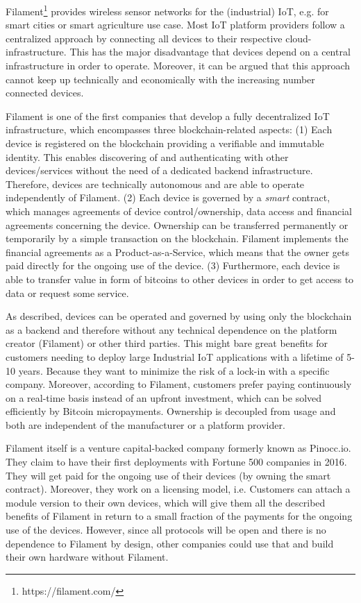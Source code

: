 Filament\footnote{https://filament.com/} provides wireless sensor networks for the (industrial) IoT, e.g. 
for smart cities or smart agriculture use case. Most IoT platform providers follow 
a centralized approach by connecting all devices to their respective cloud-infrastructure. 
This has the major disadvantage that devices depend on a central infrastructure 
in order to operate. Moreover, it can be argued that this approach cannot keep 
up technically and economically with the increasing number connected devices.

Filament is one of the first companies that develop a fully decentralized IoT infrastructure, 
which encompasses three blockchain-related aspects: (1) Each device is registered 
on the blockchain providing a verifiable and immutable identity. This enables discovering 
of and authenticating with other devices/services without the need of a dedicated 
backend infrastructure. Therefore, devices are technically autonomous and are able 
to operate independently of Filament. (2) Each device is governed by a \emph{smart} 
contract, which manages agreements of device control/ownership, data access and 
financial agreements concerning the device. Ownership can be transferred permanently 
or temporarily by a simple transaction on the blockchain. Filament implements the 
financial agreements as a Product-as-a-Service, which means that the owner gets 
paid directly for the ongoing use of the device. (3) Furthermore, each device is 
able to transfer value in form of bitcoins to other devices in order to get access 
to data or request some service.

As described, devices can be operated and governed by using only the blockchain 
as a backend and therefore without any technical dependence on the platform creator 
(Filament) or other third parties. This might bare great benefits for customers 
needing to deploy large Industrial IoT applications with a lifetime of 5-10 years. 
Because they want to minimize the risk of a lock-in with a specific company. Moreover, 
according to Filament, customers prefer paying continuously on a real-time basis 
instead of an upfront investment, which can be solved efficiently by Bitcoin micropayments. 
Ownership is decoupled from usage and both are independent of the manufacturer 
or a platform provider.

Filament itself is a venture capital-backed company formerly known as Pinocc.io. 
They claim to have their first deployments with Fortune 500 companies in 2016. 
They will get paid for the ongoing use of their devices (by owning the smart contract). 
Moreover, they work on a licensing model, i.e. Customers can attach a module version 
to their own devices, which will give them all the described benefits of Filament 
in return to a small fraction of the payments for the ongoing use of the devices. 
However, since all protocols will be open and there is no dependence to Filament 
by design, other companies could use that and build their own hardware without 
Filament.

